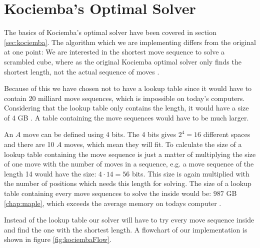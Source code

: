 \chapter{Kociemba's Optimal Solver}
\label{chap:kociembaImplement}
The basics of Kociemba's optimal solver have been covered in section \ref{sec:kociemba}. The algorithm which we are implementing differs from the original at one point:
We are interested in the shortest move sequence to solve a scrambled cube, where as the original Kociemba optimal solver only finds the shortest length, not the actual sequence of moves \cite{rokicki09}.

Because of this we have chosen not to have a lookup table since it would have to contain 20 milliard move sequences, which is impossible on today's computers. Considering that the lookup table only contains the length, it would have a size of 4 GB \cite{cubeExplorer}. A table containing the move sequences would have to be much larger.

An $A$ move can be defined using 4 bits.
The 4 bits gives $2^4=16$ different spaces and there are 10 $A$ moves, which mean they will fit.
To calculate the size of a lookup table containing the move sequence is just a matter of multiplying the size of one move with the number of moves in a sequence, e.g. a move sequence of the length 14 would have the size: $4 \cdot 14 = 56$ bits.
This size is again multiplied with the number of positions which needs this length for solving.
The size of a lookup table containing every move sequences to solve the \rubik{} inside  would be: $987$ GB \ref{chap:maple}, which exceeds the average memory on todays computer \cite{averageRAM} \cite{maxRAM2}.

Instead of the lookup table our solver will have to try every move sequence inside  and find the one with the shortest length. A flowchart of our implementation is shown in figure \ref{fig:kociembaFlow}.


